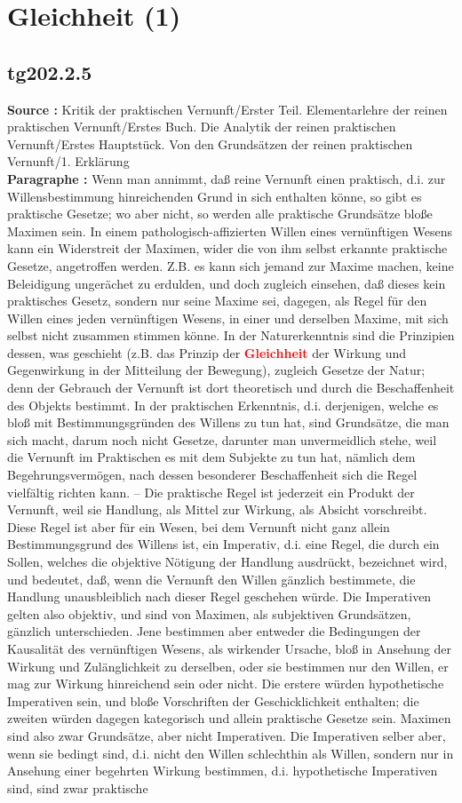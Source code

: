 \documentclass[a4paper,12pt,twoside]{book}
\newcommand{\match}[1]{\textcolor{red}{\textbf{#1}}}
\newcommand{\unnumberedsection}[1]{
	\section*{#1}
	\addcontentsline{toc}{section}{#1}
	\markright{#1}
}
\begin{document}
	\unnumberedsection{Gleichheit (1)} 
	\subsection*{tg202.2.5} 
	\textbf{Source : }Kritik der praktischen Vernunft/Erster Teil. Elementarlehre der reinen praktischen Vernunft/Erstes Buch. Die Analytik der reinen praktischen Vernunft/Erstes Hauptstück. Von den Grundsätzen der reinen praktischen Vernunft/1. Erklärung\\  
	
	\noindent\textbf{Paragraphe : }Wenn man annimmt, daß reine Vernunft einen praktisch, d.i. zur Willensbestimmung hinreichenden Grund in sich enthalten könne, so gibt es praktische Gesetze; wo aber nicht, so werden alle praktische Grundsätze bloße Maximen sein. In einem pathologisch-affizierten Willen eines vernünftigen Wesens kann ein Widerstreit der Maximen, wider die von ihm selbst erkannte praktische Gesetze, angetroffen werden. Z.B. es kann sich jemand zur Maxime machen, keine Beleidigung ungerächet zu erdulden, und doch zugleich einsehen, daß dieses kein praktisches Gesetz, sondern nur seine Maxime sei, dagegen, als Regel für den Willen eines jeden vernünftigen Wesens, in einer und derselben Maxime, mit sich selbst nicht zusammen stimmen könne. In der Naturerkenntnis sind die Prinzipien dessen, was geschieht (z.B. das Prinzip der \match{Gleichheit} der Wirkung und Gegenwirkung in der Mitteilung der Bewegung), zugleich Gesetze der Natur; denn der Gebrauch der Vernunft ist dort theoretisch und durch die Beschaffenheit des Objekts bestimmt. In der praktischen Erkenntnis, d.i. derjenigen, welche es bloß mit Bestimmungsgründen des Willens zu tun  hat, sind Grundsätze, die man sich macht, darum noch nicht Gesetze, darunter man unvermeidlich stehe, weil die Vernunft im Praktischen es mit dem Subjekte zu tun hat, nämlich dem Begehrungsvermögen, nach dessen besonderer Beschaffenheit sich die Regel vielfältig richten kann. – Die praktische Regel ist jederzeit ein Produkt der Vernunft, weil sie Handlung, als Mittel zur Wirkung, als Absicht vorschreibt. Diese Regel ist aber für ein Wesen, bei dem Vernunft nicht ganz allein Bestimmungsgrund des Willens ist, ein Imperativ, d.i. eine Regel, die durch ein Sollen, welches die objektive Nötigung der Handlung ausdrückt, bezeichnet wird, und bedeutet, daß, wenn die Vernunft den Willen gänzlich bestimmete, die Handlung unausbleiblich nach dieser Regel geschehen würde. Die Imperativen gelten also objektiv, und sind von Maximen, als subjektiven Grundsätzen, gänzlich unterschieden. Jene bestimmen aber entweder die Bedingungen der Kausalität des vernünftigen Wesens, als wirkender Ursache, bloß in Ansehung der Wirkung und Zulänglichkeit zu derselben, oder sie bestimmen nur den Willen, er mag zur Wirkung hinreichend sein oder nicht. Die erstere würden hypothetische Imperativen sein, und bloße Vorschriften der Geschicklichkeit enthalten; die zweiten würden dagegen kategorisch und allein praktische Gesetze sein. Maximen sind also zwar Grundsätze, aber nicht Imperativen. Die Imperativen selber aber, wenn sie bedingt sind, d.i. nicht den Willen schlechthin als Willen, sondern nur in Ansehung einer begehrten Wirkung bestimmen, d.i. hypothetische Imperativen sind, sind zwar praktische 
\end{document}
